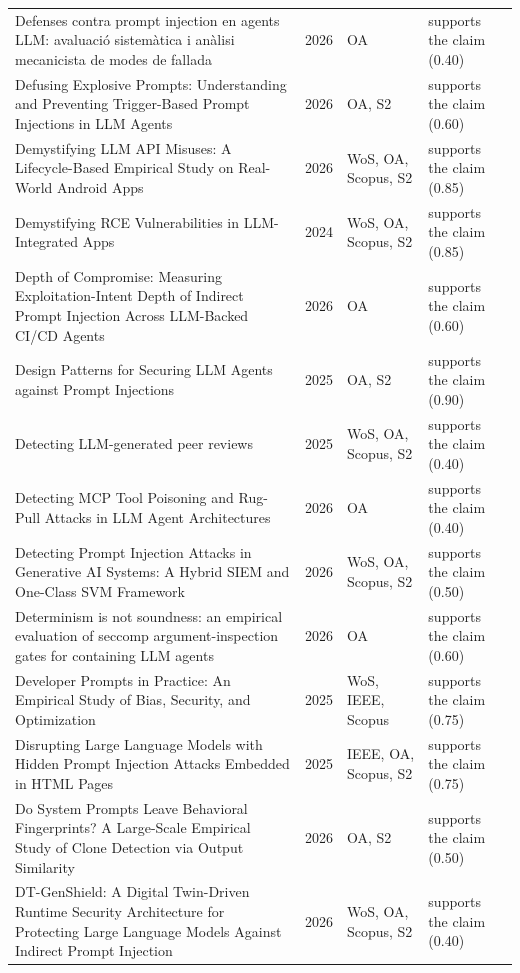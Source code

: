 \begin{longtable}{@{}%
  >{\raggedright\arraybackslash}p{}c%
  >{\raggedright\arraybackslash}p{}%
  >{\raggedright\arraybackslash}p{}@{}}
Defenses contra prompt injection en agents LLM: avaluació sistemàtica i anàlisi mecanicista de modes de fallada & 2026 & OA & supports the claim (0.40) \\
Defusing Explosive Prompts: Understanding and Preventing Trigger-Based Prompt Injections in LLM Agents & 2026 & OA, S2 & supports the claim (0.60) \\
Demystifying LLM API Misuses: A Lifecycle-Based Empirical Study on Real-World Android Apps & 2026 & WoS, OA, Scopus, S2 & supports the claim (0.85) \\
Demystifying RCE Vulnerabilities in LLM-Integrated Apps & 2024 & WoS, OA, Scopus, S2 & supports the claim (0.85) \\
Depth of Compromise: Measuring Exploitation-Intent Depth of Indirect Prompt Injection Across LLM-Backed CI/CD Agents & 2026 & OA & supports the claim (0.60) \\
Design Patterns for Securing LLM Agents against Prompt Injections & 2025 & OA, S2 & supports the claim (0.90) \\
Detecting LLM-generated peer reviews & 2025 & WoS, OA, Scopus, S2 & supports the claim (0.40) \\
Detecting MCP Tool Poisoning and Rug-Pull Attacks in LLM Agent Architectures & 2026 & OA & supports the claim (0.40) \\
Detecting Prompt Injection Attacks in Generative AI Systems: A Hybrid SIEM and One-Class SVM Framework & 2026 & WoS, OA, Scopus, S2 & supports the claim (0.50) \\
Determinism is not soundness: an empirical evaluation of seccomp argument-inspection gates for containing LLM agents & 2026 & OA & supports the claim (0.60) \\
Developer Prompts in Practice: An Empirical Study of Bias, Security, and Optimization & 2025 & WoS, IEEE, Scopus & supports the claim (0.75) \\
Disrupting Large Language Models with Hidden Prompt Injection Attacks Embedded in HTML Pages & 2025 & IEEE, OA, Scopus, S2 & supports the claim (0.75) \\
Do System Prompts Leave Behavioral Fingerprints? A Large-Scale Empirical Study of Clone Detection via Output Similarity & 2026 & OA, S2 & supports the claim (0.50) \\
DT-GenShield: A Digital Twin-Driven Runtime Security Architecture for Protecting Large Language Models Against Indirect Prompt Injection & 2026 & WoS, OA, Scopus, S2 & supports the claim (0.40) \\

\end{longtable}
